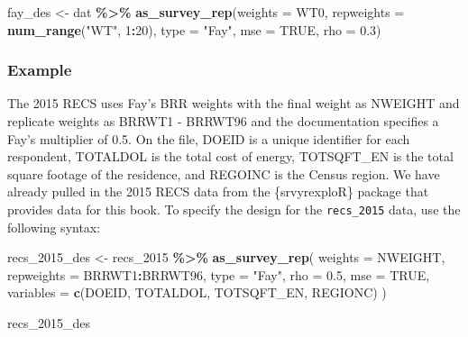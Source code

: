 \documentclass[
]{krantz}
\makeatletter
\newenvironment{Shaded}{\begin{snugshade}}{\end{snugshade}}
\newcommand{\AttributeTok}[1]{\textcolor[rgb]{0.27,0.27,0.27}{#1}}
\newcommand{\ConstantTok}[1]{\textcolor[rgb]{0.37,0.37,0.37}{#1}}
\newcommand{\DecValTok}[1]{\textcolor[rgb]{0.06,0.06,0.06}{#1}}
\newcommand{\FloatTok}[1]{\textcolor[rgb]{0.06,0.06,0.06}{#1}}
\newcommand{\FunctionTok}[1]{\textcolor[rgb]{0.27,0.27,0.27}{\textbf{#1}}}
\newcommand{\NormalTok}[1]{#1}
\newcommand{\OtherTok}[1]{\textcolor[rgb]{0.37,0.37,0.37}{#1}}
\newcommand{\SpecialCharTok}[1]{\textcolor[rgb]{0.43,0.43,0.43}{\textbf{#1}}}
\newcommand{\StringTok}[1]{\textcolor[rgb]{0.5,0.5,0.5}{#1}}
\newenvironment{kframe}{%
\medskip{}
\setlength{\fboxsep}{.8em}
 \def\at@end@of@kframe{}%
 \ifinner\ifhmode%
  \def\at@end@of@kframe{\end{minipage}}%
  \begin{minipage}{\columnwidth}%
 \fi\fi%
 \def\FrameCommand##1{\hskip\@totalleftmargin \hskip-\fboxsep
 \colorbox{shadecolor}{##1}\hskip-\fboxsep
     \hskip-\linewidth \hskip-\@totalleftmargin \hskip\columnwidth}%
 \MakeFramed {\advance\hsize-\width
   \@totalleftmargin\z@ \linewidth\hsize
   \@setminipage}}%
 {\par\unskip\endMakeFramed%
 \at@end@of@kframe}
\renewenvironment{Shaded}{\begin{kframe}}{\end{kframe}}
\makeatother
\begin{document}
\begin{Shaded}
\begin{Highlighting}[]
\NormalTok{fay\_des }\OtherTok{\textless{}{-}}\NormalTok{ dat }\SpecialCharTok{\%\textgreater{}\%}
  \FunctionTok{as\_survey\_rep}\NormalTok{(}\AttributeTok{weights =}\NormalTok{ WT0,}
                \AttributeTok{repweights =} \FunctionTok{num\_range}\NormalTok{(}\StringTok{"WT"}\NormalTok{, }\DecValTok{1}\SpecialCharTok{:}\DecValTok{20}\NormalTok{),}
                \AttributeTok{type =} \StringTok{"Fay"}\NormalTok{,}
                \AttributeTok{mse =} \ConstantTok{TRUE}\NormalTok{,}
                \AttributeTok{rho =} \FloatTok{0.3}\NormalTok{)}
\end{Highlighting}
\end{Shaded}

\hypertarget{example-8}{%
\subsubsection*{Example}\label{example-8}}


The 2015 RECS \citep{recs-2015-micro} uses Fay's BRR weights with the final weight as NWEIGHT and replicate weights as BRRWT1 - BRRWT96 and the documentation specifies a Fay's multiplier of 0.5. On the file, DOEID is a unique identifier for each respondent, TOTALDOL is the total cost of energy, TOTSQFT\_EN is the total square footage of the residence, and REGOINC is the Census region. We have already pulled in the 2015 RECS data from the \{srvyrexploR\} package that provides data for this book. To specify the design for the \texttt{recs\_2015} data, use the following syntax:

\begin{Shaded}
\begin{Highlighting}[]
\NormalTok{recs\_2015\_des }\OtherTok{\textless{}{-}}\NormalTok{ recs\_2015 }\SpecialCharTok{\%\textgreater{}\%}
  \FunctionTok{as\_survey\_rep}\NormalTok{(}
    \AttributeTok{weights =}\NormalTok{ NWEIGHT,}
    \AttributeTok{repweights =}\NormalTok{ BRRWT1}\SpecialCharTok{:}\NormalTok{BRRWT96,}
    \AttributeTok{type =} \StringTok{"Fay"}\NormalTok{,}
    \AttributeTok{rho =} \FloatTok{0.5}\NormalTok{,}
    \AttributeTok{mse =} \ConstantTok{TRUE}\NormalTok{,}
    \AttributeTok{variables =} \FunctionTok{c}\NormalTok{(DOEID, TOTALDOL, TOTSQFT\_EN, REGIONC)}
\NormalTok{  )}

\NormalTok{recs\_2015\_des}
\end{Highlighting}
\end{Shaded}
\end{document}
